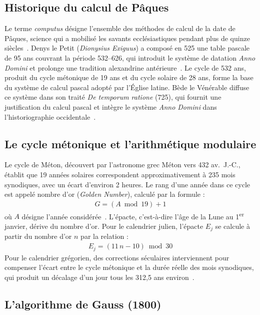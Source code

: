 \documentclass[final, fra]{anthology-ch}     %
\begin{document}
\subsection{Historique du calcul de Pâques} \label{sec:historique}

Le terme \textit{computus} désigne l'ensemble des méthodes de calcul de la date de Pâques, science qui a mobilisé les savants ecclésiastiques pendant plus de quinze siècles~\cite{bien2004}. Denys le Petit (\textit{Dionysius Exiguus}) a composé en 525 une table pascale de 95 ans couvrant la période 532--626, qui introduit le système de datation \textit{Anno Domini} et prolonge une tradition alexandrine antérieure~\cite{mosshammer2008}. Le cycle de 532 ans, produit du cycle métonique de 19 ans et du cycle solaire de 28 ans, forme la base du système de calcul pascal adopté par l'Église latine. Bède le Vénérable diffuse ce système dans son traité \textit{De temporum ratione} (725), qui fournit une justification du calcul pascal et intègre le système \textit{Anno Domini} dans l'historiographie occidentale~\cite{bede725}.

\subsection{Le cycle métonique et l'arithmétique modulaire} \label{sec:meton}

Le cycle de Méton, découvert par l'astronome grec Méton vers 432 av.~J.-C., établit que 19 années solaires correspondent approximativement à 235 mois synodiques, avec un écart d'environ 2 heures. Le rang d'une année dans ce cycle est appelé nombre d'or (\textit{Golden Number}), calculé par la formule :
\begin{align}
  G = (A \bmod 19) + 1 \label{eq:golden}
\end{align}
où $A$ désigne l'année considérée~\cite{dershowitz2018}. L'épacte, c'est-à-dire l'âge de la Lune au 1\textsuperscript{er} janvier, dérive du nombre d'or. Pour le calendrier julien, l'épacte $E_j$ se calcule à partir du nombre d'or $n$ par la relation :
\begin{align}
  E_j = (11\,n - 10) \bmod 30 \label{eq:epacte}
\end{align}
Pour le calendrier grégorien, des corrections séculaires interviennent pour compenser l'écart entre le cycle métonique et la durée réelle des mois synodiques, qui produit un décalage d'un jour tous les 312{,}5 ans environ~\cite{bien2004}.

\subsection{L'algorithme de Gauss (1800)} \label{sec:gauss}
\end{document}
